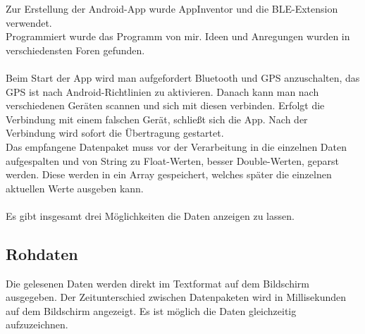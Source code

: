 Zur Erstellung der Android-App wurde AppInventor und 
die BLE-Extension verwendet.\\
Programmiert wurde das Programm von mir. Ideen und Anregungen wurden in verschiedensten 
Foren gefunden. \\
\\
Beim Start der App wird man aufgefordert Bluetooth und GPS anzuschalten, das GPS
ist nach Android-Richtlinien zu aktivieren. Danach kann man nach verschiedenen
Geräten scannen und sich mit diesen verbinden. Erfolgt die Verbindung mit einem
falschen Gerät, schließt sich die App. Nach der Verbindung wird sofort die Übertragung 
gestartet.\\
Das empfangene Datenpaket muss vor der Verarbeitung in die einzelnen Daten
aufgespalten und von String zu Float-Werten, besser Double-Werten, geparst werden.
Diese werden in ein Array gespeichert, welches später
die einzelnen aktuellen Werte ausgeben kann.\\
\\
Es gibt insgesamt drei Möglichkeiten die Daten anzeigen zu lassen.

\subsection{Rohdaten}
Die gelesenen Daten werden direkt im Textformat auf dem Bildschirm ausgegeben.
Der Zeitunterschied zwischen Datenpaketen wird in Millisekunden auf dem Bildschirm
angezeigt.
Es ist möglich die Daten gleichzeitig aufzuzeichnen.


